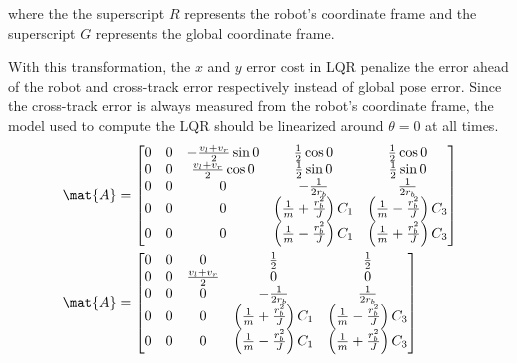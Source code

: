 where the the superscript $R$ represents the robot's coordinate frame and the
superscript $G$ represents the global coordinate frame.

With this transformation, the $x$ and $y$ error cost in LQR penalize the error
ahead of the robot and cross-track error respectively instead of global pose
error. Since the cross-track error is always measured from the robot's
coordinate frame, the \gls{model} used to compute the LQR should be linearized
around $\theta = 0$ at all times.
\begin{align*}
  \mat{A} &=
  \begin{bmatrix}
    0 & 0 & -\frac{v_l + v_r}{2}\sin 0 & \frac{1}{2}\cos 0 &
      \frac{1}{2}\cos 0 \\
    0 & 0 & \frac{v_l + v_r}{2}\cos 0 & \frac{1}{2}\sin 0 &
      \frac{1}{2}\sin 0 \\
    0 & 0 & 0 & -\frac{1}{2r_b} & \frac{1}{2r_b} \\
    0 & 0 & 0 & \left(\frac{1}{m} + \frac{r_b^2}{J}\right) C_1 &
      \left(\frac{1}{m} - \frac{r_b^2}{J}\right) C_3 \\
    0 & 0 & 0 & \left(\frac{1}{m} - \frac{r_b^2}{J}\right) C_1 &
      \left(\frac{1}{m} + \frac{r_b^2}{J}\right) C_3
  \end{bmatrix} \\
  \mat{A} &=
  \begin{bmatrix}
    0 & 0 & 0 & \frac{1}{2} & \frac{1}{2} \\
    0 & 0 & \frac{v_l + v_r}{2} & 0 & 0 \\
    0 & 0 & 0 & -\frac{1}{2r_b} & \frac{1}{2r_b} \\
    0 & 0 & 0 & \left(\frac{1}{m} + \frac{r_b^2}{J}\right) C_1 &
      \left(\frac{1}{m} - \frac{r_b^2}{J}\right) C_3 \\
    0 & 0 & 0 & \left(\frac{1}{m} - \frac{r_b^2}{J}\right) C_1 &
      \left(\frac{1}{m} + \frac{r_b^2}{J}\right) C_3
  \end{bmatrix}
\end{align*}
